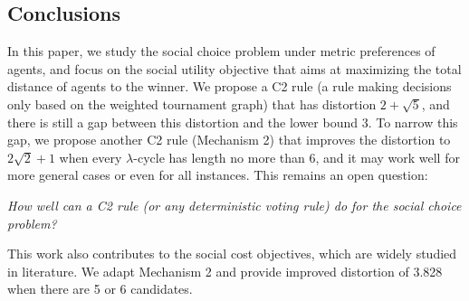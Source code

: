\documentclass[11pt]{article}
\theoremstyle{remark}
\begin{document}
\subsection{Conclusions}
In this paper, we study the social choice problem under metric preferences of agents, and focus on the social utility objective that aims at maximizing the total distance of agents to the winner. We propose a C2 rule (a rule making decisions only based on the weighted tournament graph) that has distortion $2+\sqrt5$, and there is still a gap between this distortion and the lower bound 3. To narrow this gap, we propose another C2 rule (Mechanism 2) that  improves the distortion to $2\sqrt2+1$ when every $\lambda$-cycle has length no more than 6, and it may work well for more general cases or even for all instances. This remains an open question:

\emph{How well can a C2 rule (or any deterministic voting rule) do for the social choice problem?}

This work also contributes to the social cost objectives, which are widely studied in literature. We adapt Mechanism 2 and provide improved distortion of 3.828 when there are 5 or 6 candidates.

\end{document}
